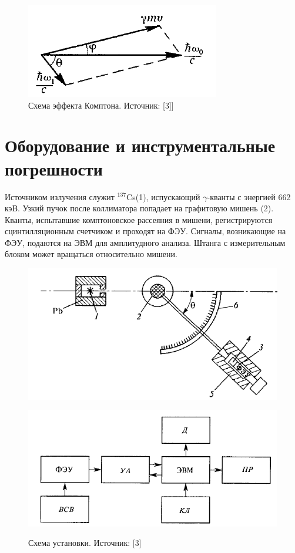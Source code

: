 \documentclass[a4paper,12pt]{article} %
\begin{document}
\begin{figure}[h!]
    \centering
    \includegraphics[width=0.5\linewidth]{fig1.PNG}
    \caption{Схема эффекта Комптона. Источник: [3]]}
    \label{fig:enter-label}
\end{figure}

\section * {Оборудование и инструментальные погрешности}

Источником излучения служит $^{137}$Cs(1), испускающий  $\gamma$-кванты с энергией 662 кэВ. Узкий пучок после коллиматора попадает на графитовую мишень (2). Кванты, испытавшие комптоновское рассеяния в мишени, регистрируются сцинтилляционным счетчиком и проходят на ФЭУ. Сигналы, возникающие на ФЭУ, подаются на ЭВМ для амплитудного анализа. Штанга с измерительным блоком может вращаться относительно мишени.

        \begin{figure}[h]
\begin{center}
\begin{minipage}[h]{0.48\linewidth}
\includegraphics[width=1\linewidth]{fig2.PNG}
\caption{Схема установки. Источник: [3]} 
\end{minipage}
\hfill 
\begin{minipage}[h]{0.48\linewidth}
\includegraphics[width=1\linewidth]{fig3.PNG}
\label{ris:experimcoded}
\end{minipage}
\end{center}
\end{figure}
\end{document}
